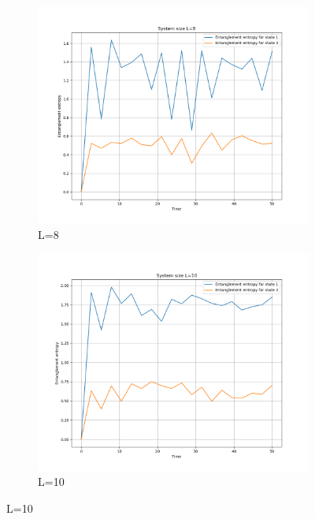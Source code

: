 \documentclass[12pt]{article}
\begin{document}
\begin{figure}[htbp]
    \centering
    \begin{subfigure}[b]{0.50\textwidth}
        \centering
        \includegraphics[width=\textwidth]{p4_1_3_Entanglement_Entropy_L=8.png}
        \caption{L=8}
        \label{fig:L8}
    \end{subfigure}
    \begin{subfigure}[b]{0.50\textwidth}
        \centering
        \includegraphics[width=\textwidth]{p4_1_3_Entanglement_Entropy_L=10.png}
        \caption{L=10}
        \label{fig:L10}
    \end{subfigure}

\end{figure}
\end{document}
